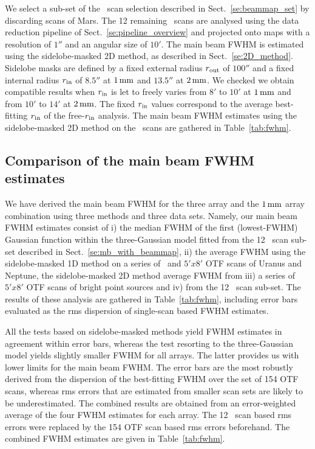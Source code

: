 We select a sub-set of the \bm\ scan selection described in
Sect.~\ref{se:beammap_set} by discarding scans of Mars.
The 12 remaining \bm\ scans are analysed using the data reduction
pipeline of Sect.~\ref{se:pipeline_overview} and projected onto maps
with a resolution of $1''$ and an angular size of $10'$.    
The main beam FWHM is estimated using the sidelobe-masked 2D method, as
described in Sect.~\ref{se:2D_method}. Sidelobe masks are
defined by a fixed external radius $r_{\rm{out}}$ of $100''$ and a
fixed internal radius $r_{\rm{in}}$ of $8.5''$ at $1\,\rm{mm}$ and
$13.5''$ at $2\,\rm{mm}$. We checked we obtain compatible results when
$r_{\rm{in}}$ is let to freely varies from $8'$ to $10'$ at
$1\,\rm{mm}$ and from $10'$ to $14'$ at $2\,\rm{mm}$. The fixed
$r_{\rm{in}}$ values correspond to the average best-fitting
$r_{\rm{in}}$ of the free-$r_{\rm{in}}$ analysis. The main beam FWHM
estimates using the sidelobe-masked 2D method on the \bm\ scans are
gathered in Table~\ref{tab:fwhm}.


\subsection{Comparison of the main beam FWHM estimates}
\label{se:fwhm_results}

We have derived the main beam FWHM for the three array and the
$1\,\rm{mm}$ array combination using three methods and three data
sets. Namely, our main beam FWHM estimates
consist of i) the median FWHM of the first (lowest-FWHM) Gaussian
function within the three-Gaussian model fitted from the 12 \bm\ scan
sub-set described in
Sect.~\ref{se:mb_with_beammap}, ii) the average FWHM using the
sidelobe-masked 1D method on a series of \bm\ and $5'x8'$ OTF scans of
Uranus and Neptune, the sidelobe-masked 2D method average FWHM
from iii) a series of $5'x8'$ OTF scans of bright point sources and
iv) from the 12 \bm\ scan sub-set. The results of these analysis are
gathered in Table~\ref{tab:fwhm}, including error bars evaluated as
the rms dispersion of single-scan based FWHM estimates.

All the tests based on sidelobe-masked methods yield FWHM estimates
in agreement within error bars, whereas the test resorting to the
three-Gaussian model yields slightly smaller FWHM for all arrays. The
latter provides us with lower limits for the main beam FWHM. The error
bars are the most robustly derived from the dispersion of the
best-fitting FWHM over the set of 154 OTF scans, whereas rms errors
that are estimated from smaller scan sets are likely to be
underestimated. The combined results are obtained from an error-weighted
average of the four FWHM estimates for each array. The 12 \bm\ scan
based rms errors were replaced by the 154 OTF scan based rms errors
beforehand.
The combined FWHM estimates are given in Table~\ref{tab:fwhm}.

